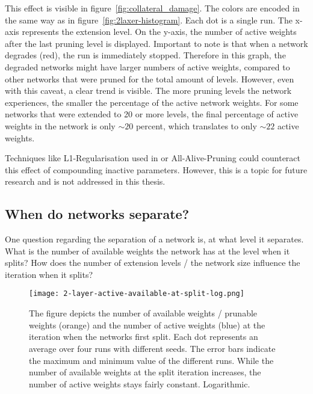 This effect is visible in figure~\ref{fig:collateral_damage}.
The colors are encoded in the same way as in figure~\ref{fig:2laxer-histogram}.
Each dot is a single run. 
The x-axis represents the extension level.
On the y-axis, the number of active weights after the last pruning level is displayed.
Important to note is that when a network degrades (red), the run is immediately stopped.
Therefore in this graph, the degraded networks might have larger numbers of active weights, compared to other networks that were pruned for the total amount of levels.
However, even with this caveat, a clear trend is visible.
The more pruning levels the network experiences, the smaller the percentage of the active network weights.
For some networks that were extended to 20 or more levels, the final percentage of active weights in the network is only $\sim20$ percent, which translates to only $\sim22$ active weights.

Techniques like L1-Regularisation used in \autocite{HanEtAl15} or All-Alive-Pruning \autocite{AllAlivePruning} could counteract this effect of compounding inactive parameters.
However, this is a topic for future research and is not addressed in this thesis. 

\subsection{When do networks separate?}
One question regarding the separation of a network is, at what level it separates.
What is the number of available weights the network has at the level when it splits?
How does the number of extension levels / the network size influence the iteration when it splits?

\begin{figure}[ht]
    \centering
    \texttt{[image: 2-layer-active-available-at-split-log.png]}
    \caption{
        The figure depicts the number of available weights / prunable weights (orange) and the number of active weights (blue) at the iteration when the networks first split.
        Each dot represents an average over four runs with different seeds.
        The error bars indicate the maximum and minimum value of the different runs.
        While the number of available weights at the split iteration increases, the number of active weights stays fairly constant.
        Logarithmic.
    }\label{fig:2l-active-split}
\end{figure}

